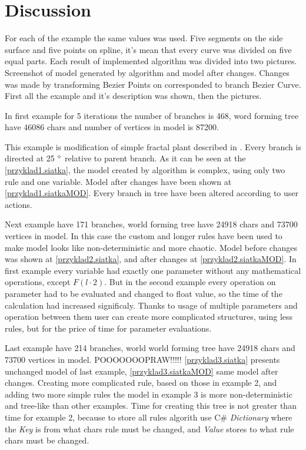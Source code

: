 \documentclass[b5paper,twoside,11pt]{article}
\begin{document}
\section{Discussion}
For each of the example the same values was used. Five segments on the side surface and five points on spline, it's mean that every curve was divided on five equal parts. Each result of implemented algorithm was divided into two pictures. Screenshot of model generated by algorithm and model after changes. Changes was made by transforming Bezier Points on corresponded to branch Bezier Curve. First all the example and it's description was shown, then the pictures.\par
In first example for 5 iterations the number of branches is 468, word forming tree have 46086 chars and number of vertices in model is 87200.\newline\par
This example is modification of simple fractal plant described in \cite{prusinABOP}.
Every branch is directed at 25  $\degree$ relative to parent branch. As it can be seen at the \figurename \ref{przyklad1.siatka}, the model created by algorithm is complex, using only two rule and one variable. Model after changes have been shown at  \figurename \ref{przyklad1.siatkaMOD}. Every branch in tree have been altered according to user actions.\par 
Next example have 171 branches, world forming tree have 24918 chars and 73700 vertices in model. In this case the custom and longer rules have been used to make model looks like non-deterministic and more chaotic. Model before changes was shown at \figurename\ref{przyklad2.siatka}, and after changes at \figurename\ref{przyklad2.siatkaMOD}. In first example every variable had exactly one parameter without any mathematical operations, except $F(l \cdot 2)$. But in the second example every operation on parameter had to be evaluated and changed to float value, so the time of the calculation had increased significaly. Thanks to usage of multiple parameters and operation between them user can create more complicated structures, using less rules, but for the price of time for parameter evaluations.\par
Last example have 214 branches, world world forming tree have 24918 chars and 73700 vertices in model. POOOOOOOPRAW!!!!!
\figurename \ref{przyklad3.siatka} presents unchanged model of last example, \figurename \ref{przyklad3.siatkaMOD} same model after changes. Creating more complicated rule, based on those in example 2, and adding two more simple rules the model in example 3 is more non-deterministic and tree-like than other examples. Time for creating this tree is not greater than time for example 2, because to store all rules algorith use C\# \textit{Dictionary} where the \textit{Key} is from what chars rule must be changed, and \textit{Value} stores to what rule chars must be changed.
\end{document}
